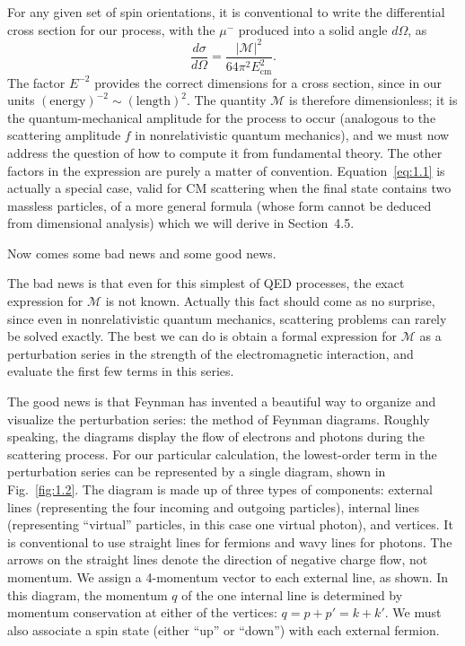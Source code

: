 For any given set of spin orientations, it is conventional to write the
differential cross section for our process, with the $\mu^{-}$ produced
into a solid angle $d\Omega$, as
\begin{equation}
  \frac{d\sigma}{d\Omega} = \frac{|\mathcal{M}|^2}{64\pi^2 E_{\mathrm{cm}}^2}.
  \label{eq:1.1}
\end{equation}
The factor $E^{-2}$ provides the correct dimensions for a cross section,
since in our units $(\mathrm{energy})^{-2}\sim(\mathrm{length})^2$.  The
quantity $\mathcal{M}$ is therefore dimensionless; it is the
quantum-mechanical amplitude for the process to occur (analogous to the
scattering amplitude $f$ in nonrelativistic quantum mechanics), and we
must now address the question of how to compute it from fundamental
theory.  The other factors in the expression are purely a matter of
convention.  Equation~\eqref{eq:1.1} is actually a special case, valid for
CM scattering when the final state contains two massless particles, of a
more general formula (whose form cannot be deduced from dimensional
analysis) which we will derive in Section~4.5.

Now comes some bad news and some good news.

The bad news is that even for this simplest of QED processes, the exact
expression for $\mathcal{M}$ is not known.  Actually this fact should come
as no surprise, since even in nonrelativistic quantum mechanics,
scattering problems can rarely be solved exactly.  The best we can do is
obtain a formal expression for $\mathcal{M}$ as a perturbation series in
the strength of the electromagnetic interaction, and evaluate the first
few terms in this series.

The good news is that Feynman has invented a beautiful way to organize
and visualize the perturbation series: the method of Feynman diagrams.
Roughly speaking, the diagrams display the flow of electrons and photons
during the scattering process.  For our particular calculation, the
lowest-order term in the perturbation series can be represented by a
single diagram, shown in Fig.~\ref{fig:1.2}.  The diagram is made up of
three types of components: external lines (representing the four incoming
and outgoing particles), internal lines (representing ``virtual''
particles, in this case one virtual photon), and vertices.  It is
conventional to use straight lines for fermions and wavy lines for
photons.  The arrows on the straight lines denote the direction of
negative charge flow, not momentum.  We assign a 4-momentum vector to
each external line, as shown.  In this diagram, the momentum $q$ of the
one internal line is determined by momentum conservation at either of the
vertices: $q=p+p'=k+k'$.  We must also associate a spin state (either
``up'' or ``down'') with each external fermion.

